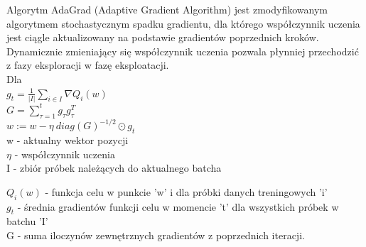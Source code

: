 
Algorytm AdaGrad (Adaptive Gradient Algorithm) jest zmodyfikowanym algorytmem stochastycznym spadku gradientu, dla którego współczynnik uczenia jest ciągle aktualizowany na podstawie gradientów poprzednich kroków. Dynamicznie zmieniający się współczynnik uczenia pozwala płynniej przechodzić z fazy eksploracji w fazę eksploatacji.\\


Dla\\

$g_t = \frac{1}{|I|}  \displaystyle \sum_{i\in{I}} \nabla Q_i(w)$\\

$G = \displaystyle \sum_{\tau=1}^{t} g_\tau g_\tau^T$\\

$w := w - \eta \ diag(G)^{-1/2} \odot g_t$\\

w - aktualny wektor pozycji\\

$\eta$ - współczynnik uczenia\\

I - zbiór próbek należących do aktualnego batcha

$Q_i(w)$ - funkcja celu w punkcie 'w' i dla próbki danych treningowych 'i'\\

$g_t$ - średnia gradientów funkcji celu w momencie 't' dla wszystkich próbek w batchu 'I'\\

G - suma iloczynów zewnętrznych gradientów z poprzednich iteracji.\\






